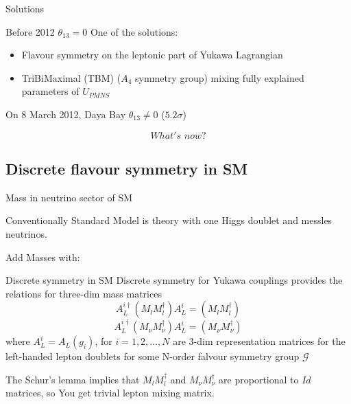 \documentclass{beamer}
\begin{document}
\begin{frame}{Solutions}
\begin{block}{Before 2012 $\theta_{13}=0$}
One of the solutions:
\begin{itemize}
\item Flavour symmetry on the leptonic part of Yukawa Lagrangian
\item TriBiMaximal (TBM) ($A_4$ symmetry group) mixing fully explained parameters of $U_{PMNS}$

\end{itemize}
 \end{block}
 
On 8 March 2012, Daya Bay $\theta_{13}\neq0$ ($5.2\sigma$) 
 
$$What's\,\, now ?  $$
\end{frame}


\subsection{Discrete flavour symmetry in SM}

\begin{frame}{Mass in neutrino sector of SM}
\begin{block}{}
Conventionally Standard Model is theory with \alert{one Higgs doublet} and \alert{messles neutrinos}.
\end{block}

Add Masses with: 
\begin{itemize}
    \end{itemize}

 
\end{frame}

\begin{frame}{Discrete symmetry in SM}
Discrete symmetry for Yukawa couplings provides the relations for  three-dim mass matrices      
$$A^{i \dag}_{L}\left( M_l M_l^\dag \right) A^{i}_{L} = \left( M_l M_l^\dag \right)$$   
$$A^{i \dag}_{L}\left( M_\nu M_\nu^\dag \right) A^{i}_{L} = \left( M_\nu M_\nu^\dag \right)$$ 
where $A^{i}_{L}=A_{L}(g_i)$, for $i = 1,2,\dots,N$ are \alert{3-dim representation matrices for the left-handed lepton doublets for some N-order falvour symmetry group $\mathcal{G}$ }

The Schur's lemma implies that $M_l M_l^\dag $ and $M_\nu M_\nu^\dag$ are proportional to $Id$ matrices, so You get \alert{trivial lepton mixing matrix}.

\end{frame}
\end{document}
